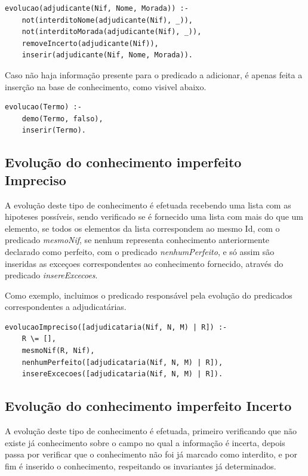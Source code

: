 \documentclass[a4paper]{report}
\begin{document}
\begin{verbatim}
evolucao(adjudicante(Nif, Nome, Morada)) :-
    not(interditoNome(adjudicante(Nif), _)),
    not(interditoMorada(adjudicante(Nif), _)),
    removeIncerto(adjudicante(Nif)),
    inserir(adjudicante(Nif, Nome, Morada)).
\end{verbatim}

Caso não haja informação presente para o predicado a adicionar, é apenas feita a
inserção na base de conhecimento, como visivel abaixo.

\begin{verbatim}
evolucao(Termo) :-
    demo(Termo, falso),
    inserir(Termo).
\end{verbatim}

\subsection{Evolução do conhecimento imperfeito Impreciso}

A evolução deste tipo de conhecimento é efetuada recebendo uma lista com as
hipoteses possíveis, sendo verificado se é fornecido uma lista com mais do que
um elemento, se todos os elementos da lista correspondem ao mesmo Id, com o
predicado \textit{mesmoNif}, se nenhum representa conhecimento 
anteriormente declarado como perfeito, com o predicado
\textit{nenhumPerfeito}, e só assim são inseridas as exceçoes 
correspondentes ao conhecimento fornecido, através do predicado
\textit{insereExcecoes}.

Como exemplo, incluimos o predicado responsável pela evolução do predicados
correspondentes a adjudicatárias.

\begin{verbatim}
evolucaoImpreciso([adjudicataria(Nif, N, M) | R]) :-
    R \= [],
    mesmoNif(R, Nif),
    nenhumPerfeito([adjudicataria(Nif, N, M) | R]),
    insereExcecoes([adjudicataria(Nif, N, M) | R]).
\end{verbatim}

\subsection{Evolução do conhecimento imperfeito Incerto}

A evolução deste tipo de conhecimento é efetuada, primeiro verificando que não
existe já conhecimento sobre o campo no qual a informação é incerta, depois
passa por verificar que o conhecimento não foi já marcado como interdito, e por
fim é inserido o conhecimento, respeitando os invariantes já determinados.
\end{document}
